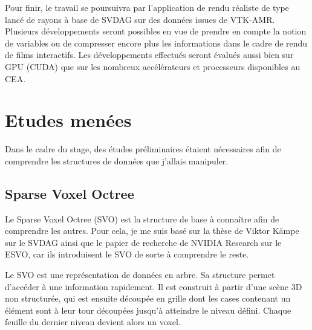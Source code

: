 \documentclass[12pt,a4paper,twoside]{article}
\begin{document}
    Pour finir, le travail se poursuivra par l'application de rendu réaliste de type lancé de rayons à base de SVDAG sur
    des données issues de VTK-AMR. Plusieurs développements seront possibles en vue de prendre en compte la notion de variables ou de
    compresser encore plus les informations dans le cadre de rendu de films interactifs. Les développements effectués seront
    évalués aussi bien sur GPU (CUDA) que sur les nombreux accélérateurs et processeurs disponibles au CEA.

    \newpage
    \section{Etudes menées}     %

    Dans le cadre du stage, des études préliminaires étaient nécessaires afin de comprendre les structures de données que
    j'allais manipuler.

    \subsection{Sparse Voxel Octree}

    Le Sparse Voxel Octree (SVO) est la structure de base à connaître afin de comprendre les autres.
    Pour cela, je me suis basé sur la thèse de Viktor Kämpe sur le SVDAG ainsi que le papier de recherche de NVIDIA
    Research sur le ESVO, car ils introduisent le SVO de sorte à comprendre le reste.

    Le SVO est une représentation de données en arbre. Sa structure permet d'accéder à une information rapidement.
    Il est construit à partir d'une scène 3D non structurée, qui est ensuite découpée en grille dont les cases contenant un élément sont à leur tour découpées jusqu'à atteindre le niveau défini.
    Chaque feuille du dernier niveau devient alors un voxel.

    \begin{figure}[H]
    \end{figure}


    \begin{figure}[H]
    \end{figure}
\end{document}
